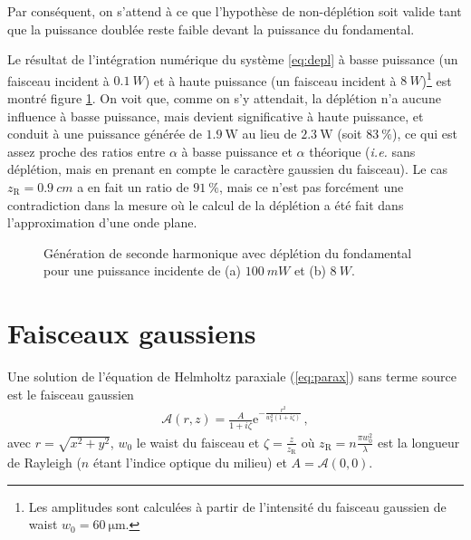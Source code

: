 \documentclass[11pt,a4paper]{article}
\newcommand{\zr}{z_\mathsc{R}}
\newcommand{\A}{\mathcal{A}}
\newcommand{\e}[1]{\text{e}^{#1}}
\newcommand{\mathsc}[1]{\mathrm{\scriptscriptstyle {#1}}}
\begin{document}
Par conséquent, on s'attend à ce que l'hypothèse de non-déplétion soit valide tant que la puissance doublée reste faible devant la puissance du fondamental.

Le résultat de l'intégration numérique du système \eqref{eq:depl} à basse puissance (un faisceau incident à $\SI{0.1}{W}$) et à haute puissance (un faisceau incident à $\SI{8}{W}$)\footnote{Les amplitudes sont calculées à partir de l'intensité du faisceau gaussien de waist $w_0 = \SI{60}{\micro\meter}$.} est montré figure \ref{fig:depl}. On voit que, comme on s'y attendait, la déplétion n'a aucune influence à basse puissance, mais devient significative à haute puissance, et conduit à une puissance générée de $\SI{1.9}{\watt}$ au lieu de $\SI{2.3}{\watt}$ (soit $\SI{83}{\percent}$), ce qui est assez proche des ratios entre $\alpha$ à basse puissance et $\alpha$ théorique (\textit{i.e.} sans déplétion, mais en prenant en compte le caractère gaussien du faisceau). Le cas $\zr=\SI{0.9}{cm}$ a en fait un ratio de $\SI{91}{\percent}$, mais ce n'est pas forcément une contradiction dans la mesure où le calcul de la déplétion a été fait dans l'approximation d'une onde plane.

\begin{figure}[htpb]  
\centering
\begin{subfigure}[b]{0.47\textwidth}
	\centering
	
	\vspace{-0.8cm}
	\caption{}
\end{subfigure}
%
\hspace*{0.5cm}
\begin{subfigure}[b]{0.47\textwidth}
	\centering
	
	\vspace{-0.8cm}
	\caption{}
\end{subfigure}
\caption{Génération de seconde harmonique avec déplétion du fondamental pour une puissance incidente de (a) $\SI{100}{mW}$ et (b) $\SI{8}{W}$.}
\label{fig:depl}
\end{figure}

\section{Faisceaux gaussiens}
\label{gauss}
Une solution de l'équation de Helmholtz paraxiale (\ref{eq:parax}) sans terme source est le faisceau gaussien
\begin{align}
\A(r,z) = \frac{A}{1+i\zeta} \e{-\frac{r^{2}}{w_{0}^{2} (1+i\zeta) }} \,,
\label{eq:gauss}
\end{align}
avec $r=\sqrt{x^2+y^2}$, $w_0$ le waist du faisceau et $\zeta = \frac{z}{z_\mathsc{R}}$ où $\zr = n \frac{\pi w_0^2}{\lambda}$ est la longueur de Rayleigh ($n$ étant l'indice optique du milieu) et $A = \A(0,0)$.
\end{document}

